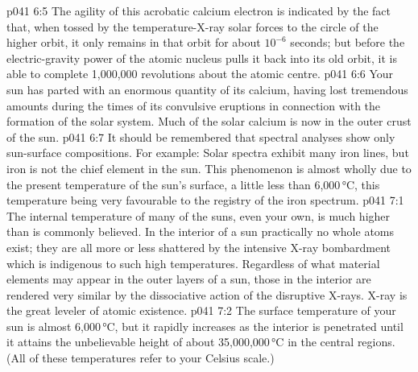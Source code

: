 \vs p041 6:5 The agility of this acrobatic calcium electron is indicated by the fact that, when tossed by the temperature\hyp{}X\hyp{}ray solar forces to the circle of the higher orbit, it only remains in that orbit for about $10^{-6}$ seconds; but before the electric\hyp{}gravity power of the atomic nucleus pulls it back into its old orbit, it is able to complete 1,000,000 revolutions about the atomic centre.
\vs p041 6:6 \pc Your sun has parted with an enormous quantity of its calcium, having lost tremendous amounts during the times of its convulsive eruptions in connection with the formation of the solar system. Much of the solar calcium is now in the outer crust of the sun.
\vs p041 6:7 \pc It should be remembered that spectral analyses show only sun\hyp{}surface compositions. For example: Solar spectra exhibit many iron lines, but iron is not the chief element in the sun. This phenomenon is almost wholly due to the present temperature of the sun’s surface, a little less than 6,000\,°C, this temperature being very favourable to the registry of the iron spectrum.
\vs p041 7:1 The internal temperature of many of the suns, even your own, is much higher than is commonly believed. In the interior of a sun practically no whole atoms exist; they are all more or less shattered by the intensive X\hyp{}ray bombardment which is indigenous to such high temperatures. Regardless of what material elements may appear in the outer layers of a sun, those in the interior are rendered very similar by the dissociative action of the disruptive X\hyp{}rays. X\hyp{}ray is the great leveler of atomic existence.
\vs p041 7:2 The surface temperature of your sun is almost 6,000\,°C, but it rapidly increases as the interior is penetrated until it attains the unbelievable height of about 35,000,000\,°C in the central regions. (All of these temperatures refer to your Celsius scale.)
